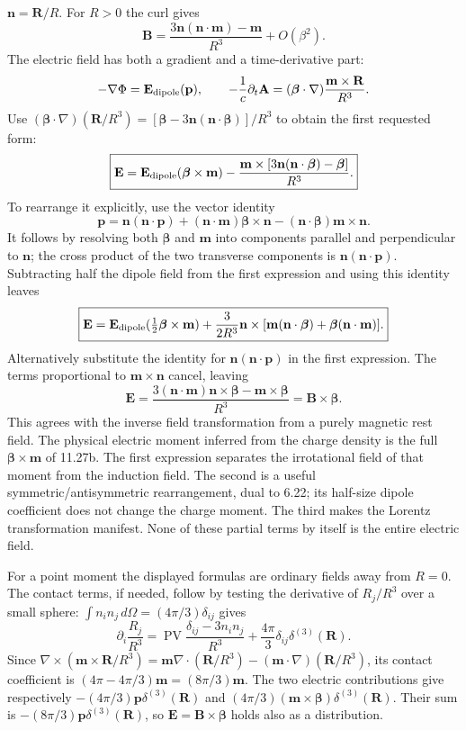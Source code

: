 $\mathbf n=\mathbf R/R$. For $R>0$ the curl gives
\[
\boxed{\mathbf B=\frac{3\mathbf n(\mathbf n\cdot\mathbf m)-\mathbf m}{R^3}
+O(\beta^2).}
\]
The electric field has both a gradient and a time-derivative part:
\[
-\nabla\Phi=\mathbf E_{\rm dipole}(\mathbf p),\qquad
-\frac1c\partial_t\mathbf A
=(\boldsymbol\beta\cdot\nabla)\frac{\mathbf m\times\mathbf R}{R^3}.
\]
Use
$(\boldsymbol\beta\cdot\nabla)(\mathbf R/R^3)
=[\boldsymbol\beta-3\mathbf n(\mathbf n\cdot\boldsymbol\beta)]/R^3$
to obtain the first requested form:
\[
\boxed{\mathbf E=\mathbf E_{\rm dipole}(\boldsymbol\beta\times\mathbf m)
-\frac{\mathbf m\times[3\mathbf n(\mathbf n\cdot\boldsymbol\beta)
-\boldsymbol\beta]}{R^3}.}
\]
To rearrange it explicitly, use the vector identity
\[
\mathbf p=\mathbf n(\mathbf n\cdot\mathbf p)
+(\mathbf n\cdot\mathbf m)\boldsymbol\beta\times\mathbf n
-(\mathbf n\cdot\boldsymbol\beta)\mathbf m\times\mathbf n.
\]
It follows by resolving both $\boldsymbol\beta$ and $\mathbf m$
into components parallel and perpendicular to $\mathbf n$;
the cross product of the two transverse components is
$\mathbf n(\mathbf n\cdot\mathbf p)$.
Subtracting half the dipole field from the first expression and
using this identity leaves
\[
\boxed{\mathbf E=\mathbf E_{\rm dipole}(\tfrac12\boldsymbol\beta\times\mathbf m)
+\frac{3}{2R^3}\mathbf n\times
[\mathbf m(\mathbf n\cdot\boldsymbol\beta)
+\boldsymbol\beta(\mathbf n\cdot\mathbf m)].}
\]
Alternatively substitute the identity for
$\mathbf n(\mathbf n\cdot\mathbf p)$ in the first expression.
The terms proportional to $\mathbf m\times\mathbf n$ cancel,
leaving
\[
\mathbf E=\frac{3(\mathbf n\cdot\mathbf m)\mathbf n\times\boldsymbol\beta
-\mathbf m\times\boldsymbol\beta}{R^3}
=\boxed{\mathbf B\times\boldsymbol\beta}.
\]
This agrees with the inverse field transformation from a purely
magnetic rest field. The physical electric moment inferred from
the charge density is the full $\boldsymbol\beta\times\mathbf m$
of 11.27b. The first expression separates the irrotational field
of that moment from the induction field. The second is a useful
symmetric/antisymmetric rearrangement, dual to 6.22; its half-size
dipole coefficient does not change the charge moment. The third
makes the Lorentz transformation manifest. None of these partial
terms by itself is the entire electric field.

For a point moment the displayed formulas are ordinary fields
away from $R=0$. The contact terms, if needed, follow by testing
the derivative of $R_j/R^3$ over a small sphere:
$\int n_in_j\,d\Omega=(4\pi/3)\delta_{ij}$ gives
\[
\partial_i\frac{R_j}{R^3}
=\operatorname{PV}\frac{\delta_{ij}-3n_in_j}{R^3}
+\frac{4\pi}{3}\delta_{ij}\delta^{(3)}(\mathbf R).
\]
Since $\nabla\times(\mathbf m\times\mathbf R/R^3)
=\mathbf m\nabla\cdot(\mathbf R/R^3)
-(\mathbf m\cdot\nabla)(\mathbf R/R^3)$, its contact coefficient
is $(4\pi-4\pi/3)\mathbf m=(8\pi/3)\mathbf m$.
The two electric contributions give respectively
$-(4\pi/3)\mathbf p\delta^{(3)}(\mathbf R)$ and
$(4\pi/3)(\mathbf m\times\boldsymbol\beta)\delta^{(3)}(\mathbf R)$.
Their sum is $-(8\pi/3)\mathbf p\delta^{(3)}(\mathbf R)$,
so $\mathbf E=\mathbf B\times\boldsymbol\beta$ holds also
as a distribution.

